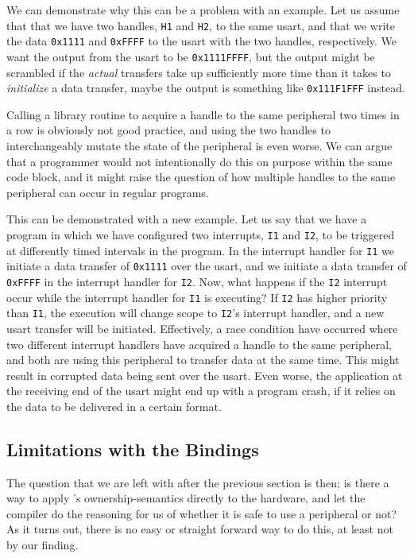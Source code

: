 We can demonstrate why this can be a problem with an example.
Let us assume that that we have two handles, \texttt{H1} and \texttt{H2}, to the same \gls{usart}, and that we write the data \texttt{0x1111} and \texttt{0xFFFF} to the \gls{usart} with the two handles, respectively.
We want the output from the \gls{usart} to be \texttt{0x1111FFFF}, but the output might be scrambled if the \emph{actual} transfers take up sufficiently more time than it takes to \emph{initialize} a data transfer, maybe the output is something like \texttt{0x111F1FFF} instead.

Calling a library routine to acquire a handle to the same peripheral two times in a row is obviously not good practice, and using the two handles to interchangeably mutate the state of the peripheral is even worse.
We can argue that a programmer would not intentionally do this on purpose within the same code block, and it might raise the question of how multiple handles to the same peripheral can occur in regular programs.

This can be demonstrated with a new example.
Let us say that we have a program in which we have configured two interrupts, \texttt{I1} and \texttt{I2}, to be triggered at differently timed intervals in the program.
In the interrupt handler for \texttt{I1} we initiate a data transfer of \texttt{0x1111} over the \gls{usart}, and we initiate a data transfer of \texttt{0xFFFF} in the interrupt handler for \texttt{I2}.
Now, what happens if the \texttt{I2} interrupt occur while the interrupt handler for \texttt{I1} is executing?
If \texttt{I2} has higher priority than \texttt{I1}, the execution will change scope to \texttt{I2}'s interrupt handler, and a new \gls{usart} transfer will be initiated.
Effectively, a race condition have occurred where two different interrupt handlers have acquired a handle to the same peripheral, and both are using this peripheral to transfer data at the same time.
This might result in corrupted data being sent over the \gls{usart}.
Even worse, the application at the receiving end of the \gls{usart} might end up with a program crash, if it relies on the data to be delivered in a certain format.

\subsection{Limitations with the Bindings}

The question that we are left with after the previous section is then; is there a way to apply {\rust}'s ownership-semantics directly to the hardware, and let the {\rust} compiler do the reasoning for us of whether it is safe to use a peripheral or not?
As it turns out, there is no easy or straight forward way to do this, at least not by our finding.

